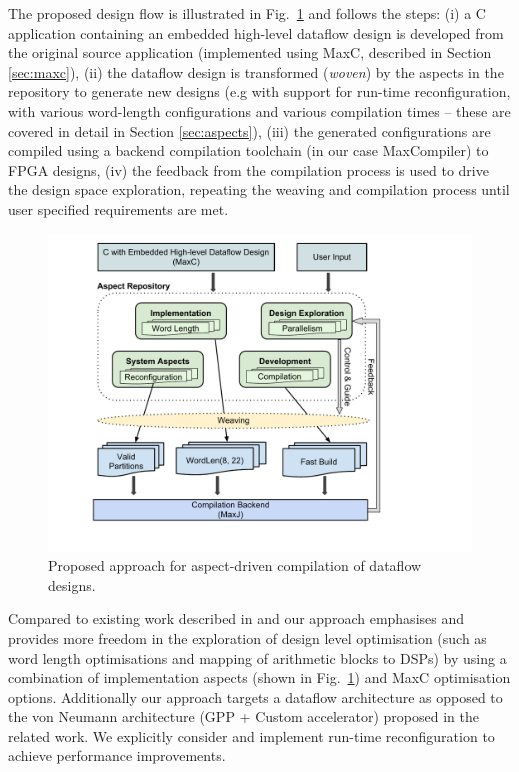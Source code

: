 The proposed design flow is illustrated in Fig.~\ref{fig:design-flow}
and follows the steps: (i) a C application containing an embedded
high-level dataflow design is developed from the original source
application (implemented using MaxC, described in Section
\ref{sec:maxc}), (ii) the dataflow design is transformed (\emph{woven})
by the aspects in the repository to generate new designs (e.g with
support for run-time reconfiguration, with various word-length
configurations and various compilation times -- these are covered in
detail in Section \ref{sec:aspects}), (iii) the generated
configurations are compiled using a backend compilation toolchain (in
our case MaxCompiler) to FPGA designs, (iv) the feedback from the
compilation process is used to drive the design space exploration,
repeating the weaving and compilation process until user specified
requirements are met.

\begin{figure}[!h]
  \includegraphics[scale=0.48, trim=60 50 0 0]{figs/design-flow}
  \caption{Proposed approach for aspect-driven compilation of dataflow
    designs.}
  \label{fig:design-flow}
\end{figure}

Compared to existing work described in
\cite{Cardoso:Teixeira:Alves:Nobre:Diniz:Cutinho:Luk:2012} and
\cite{cardoso2011new} our approach emphasises and provides more
freedom in the exploration of design level optimisation (such as word
length optimisations and mapping of arithmetic blocks to DSPs) by
using a combination of implementation aspects (shown in
Fig.~\ref{fig:design-flow}) and MaxC optimisation options.
Additionally our approach targets a dataflow architecture as opposed
to the von Neumann architecture (GPP + Custom accelerator) proposed in
the related work. We explicitly consider and implement run-time
reconfiguration to achieve performance improvements.
